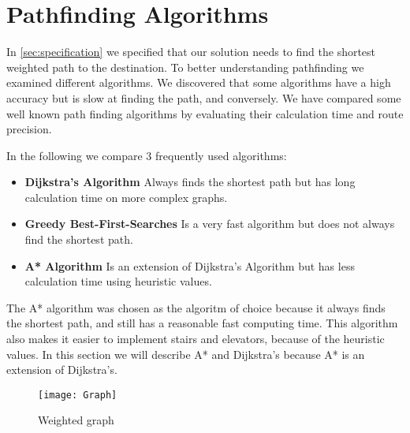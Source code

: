\section{Pathfinding Algorithms}

  In \cref{sec:specification} we specified that our solution needs to find the shortest weighted path to the destination.
  To better understanding pathfinding we examined different algorithms. We discovered that some algorithms have a high accuracy but is slow at finding the path, and conversely.
  We have compared some well known path finding algorithms by evaluating their calculation time and route precision.

  In the following we compare 3 frequently used algorithms:
  \begin{itemize}
    \setlength{\itemsep}{1pt}
    \setlength{\parskip}{0pt}
    \setlength{\parsep}{0pt}
    \item \textbf{Dijkstra's Algorithm} Always finds the shortest path but has long calculation time on more complex graphs.
    \item \textbf{Greedy Best-First-Searches} Is a very fast algorithm but does not always find the shortest path.
    \item \textbf{A* Algorithm} Is an extension of Dijkstra's Algorithm but has less calculation time using heuristic values.
\end{itemize}

The A* algorithm was chosen as the algoritm of choice because it always finds the shortest path, and still has a reasonable fast computing time. This algorithm also makes it easier to implement stairs and elevators, because of the heuristic values. In this section we will describe A* and Dijkstra's because A* is an extension of Dijkstra's.




  \begin{figure}[ht!]
    \centering
    \texttt{[image: Graph]}
    \caption{Weighted graph}
    \label{fig:graph}
  \end{figure}


